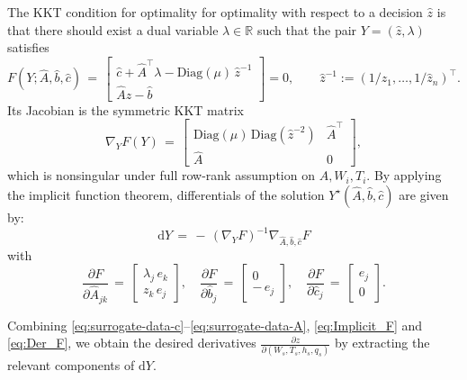\documentclass{article}
\begin{document}
The KKT condition for optimality for optimality with respect to a decision $\hat z$ is that there should exist a dual variable $\lambda \in \mathbb{R}$ such that the pair $Y =  (\hat z,\lambda)$ satisfies
\begin{equation}
F(Y;\hat A,\hat b,\hat c) \,=\, \begin{bmatrix} \hat c + \hat A^\top \lambda - \mathrm{Diag}(\mu)\,\hat z^{-1} \\ \hat A \hat z - \hat b \end{bmatrix} = 0,\qquad \hat z^{-1} := (1/\hat z_1,\dots,1/\hat z_n)^\top.
\end{equation}
Its Jacobian is the symmetric KKT matrix
\begin{equation}
\nabla_Y F(Y) \,=\, \begin{bmatrix} \mathrm{Diag}(\mu)\,\mathrm{Diag}(\hat z^{-2}) & \hat A^\top \\ \hat A & 0 \end{bmatrix},
\end{equation}
which is nonsingular under full row-rank assumption on $A, W_i, T_i$. By applying the implicit function theorem, differentials of the solution $Y^\star(\hat A,\hat b,\hat c)$ are given by:
\begin{equation}\label{eq:Implicit_F}
\mathrm{d}Y \,=\, -\,(\nabla_Y F)^{-1}\nabla_{\hat A,\hat b,\hat c}F
\end{equation}
with
\begin{equation}\label{eq:Der_F}
\frac{\partial F}{\partial \hat A_{jk}} \,=\, \begin{bmatrix} \lambda_j \, e_k \\ z_k \, e_j \end{bmatrix},\quad
\frac{\partial F}{\partial \hat b_j} \,=\, \begin{bmatrix} 0 \\ -\,e_j \end{bmatrix},\quad
\frac{\partial F}{\partial \hat c_j} \,=\, \begin{bmatrix} e_j \\ 0 \end{bmatrix}.
\end{equation}

Combining \eqref{eq:surrogate-data-c}--\eqref{eq:surrogate-data-A}, \eqref{eq:Implicit_F} and \eqref{eq:Der_F}, we obtain the desired derivatives $\tfrac{\partial z}{\partial (W_s,T_s,h_s,q_s)}$ by extracting the relevant components of $\mathrm{d}Y$.
\end{document}
